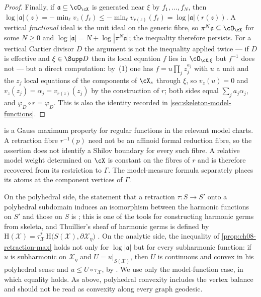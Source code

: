 \begin{proof}
Finally, if $\mathfrak a\subseteq\cO_{\cX}$ is generated near $\xi$ by
$f_1,\ldots,f_N$, then
$\log|\mathfrak a|(z)=-\min_\ell v_z(f_\ell)\leq-\min_\ell v_{r(z)}(f_\ell)
=\log|\mathfrak a|(r(z))$.  A vertical \emph{fractional} ideal is the unit
ideal on the generic fibre, so $\pi^N\mathfrak a\subseteq\cO_{\cX}$ for some
$N\geq0$ and $\log|\mathfrak a|=N+\log|\pi^N\mathfrak a|$; the inequality
therefore persists.  For a vertical Cartier divisor $D$ the argument is not
the inequality applied twice --- if $D$ is effective and $\xi\in\Supp D$ then
its local equation $f$ lies in $\cO_{\cX,\xi}$ but $f^{-1}$ does not --- but
a direct computation: by \,(1) one has
$f=u\prod_jz_j^{a_j}$ with $u$ a unit and the $z_j$ local equations of the
components of $\cX_s$ through $\xi$, so $v_z(u)=0$ and
$v_z(z_j)=\alpha_j=v_{r(z)}(z_j)$ by the construction of $r$; both sides
equal $\sum_ja_j\alpha_j$, and $\varphi_D\circ r=\varphi_D$.  This is also
the identity recorded in \cref{sec:skeleton-model-functions}.
\end{proof}

\begin{remark}
\label{rem:ch08-retraction-shilov}
 is a Gauss maximum property for regular
functions in the relevant model charts.  A retraction fibre $r^{-1}(p)$
need not be an affinoid formal reduction fibre, so the assertion does not
identify a Shilov boundary for every such fibre.  A relative model weight
determined on $\cX$ is constant on the fibres of $r$ and is therefore
recovered from its restriction to $\Gamma$.  The model-measure formula
separately places its atoms at the component vertices of $\Gamma$.
\end{remark}

\begin{remark}
\label{rem:ch08-retraction-thuillier}
On the polyhedral side, the statement that a retraction
$\tau:S\to S'$ onto a polyhedral subdomain induces an isomorphism between the
harmonic functions on $S'$ and those on $S$ is \cite[Prop.~1.2.20]{Thu05};
this is one of the tools for constructing harmonic germs from skeleta, and
Thuillier's sheaf of harmonic germs is defined by
$\mathrm H(\mathcal X)=\tau_{\mathcal X}^{*}\,\mathrm
H\bigl(S(\mathcal X),\partial\mathcal X_\eta\bigr)$
\cite[Def.~2.3.1 and Def.~2.3.16]{Thu05}.  On the analytic side, the
inequality of \cref{prop:ch08-retraction-max} holds not only for
$\log|\mathfrak a|$ but for every subharmonic function: if $u$ is subharmonic
on $\mathcal X_\eta$ and $U=u|_{S(\mathcal X)}$, then $U$ is continuous and
convex in his polyhedral sense and $u\leq U\circ\tau_{\mathcal X}$, by
\cite[Prop.~3.4.6]{Thu05}.  We use only the model-function case, in which
equality holds.  As above, polyhedral convexity includes the vertex
balance and should not be read as convexity along every graph geodesic.
\end{remark}

